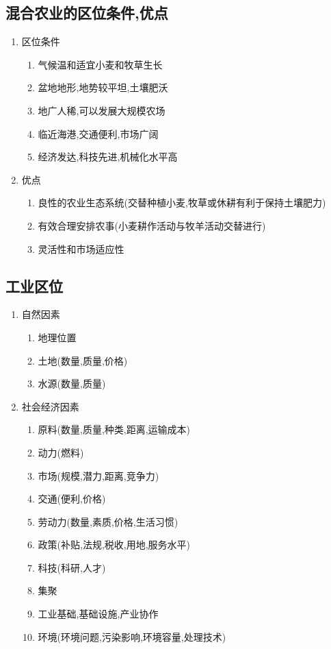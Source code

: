 \documentclass[a4paper]{article}
\begin{document}
    \subsection{混合农业的区位条件,优点}
    \begin{enumerate}
        \item 区位条件
        \begin{enumerate}
            \item 气候温和适宜小麦和牧草生长
            \item 盆地地形,地势较平坦,土壤肥沃
            \item 地广人稀,可以发展大规模农场
            \item 临近海港,交通便利,市场广阔
            \item 经济发达,科技先进,机械化水平高
        \end{enumerate}
        \item 优点
        \begin{enumerate}
            \item 良性的农业生态系统(交替种植小麦,牧草或休耕有利于保持土壤肥力)
            \item 有效合理安排农事(小麦耕作活动与牧羊活动交替进行)
            \item 灵活性和市场适应性
        \end{enumerate}
    \end{enumerate}
    \subsection{工业区位}
    \begin{enumerate}
        \item 自然因素
        \begin{enumerate}
            \item 地理位置
            \item 土地(数量,质量,价格)
            \item 水源(数量,质量)
        \end{enumerate}
        \item 社会经济因素
        \begin{enumerate}
            \item 原料(数量,质量,种类,距离,运输成本)
            \item 动力(燃料)
            \item 市场(规模,潜力,距离,竞争力)
            \item 交通(便利,价格)
            \item 劳动力(数量,素质,价格,生活习惯)
            \item 政策(补贴,法规,税收,用地,服务水平)
            \item 科技(科研,人才)
            \item 集聚
            \item 工业基础,基础设施,产业协作
            \item 环境(环境问题,污染影响,环境容量,处理技术) %
        \end{enumerate}
    \end{enumerate}
\end{document}
